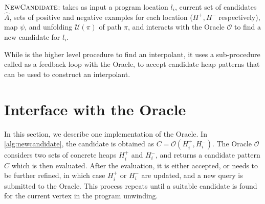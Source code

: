 \begin{algorithm}[ht]


  \caption{$\textsc{NewCandidate}$: takes as input a program location $l_i$, current set of candidates $\hat{A}$, sets of positive and negative examples for each location ($H^{+}, H^{-}$ respectively), map $\psi$, and unfolding $\mathcal{U}(\pi)$ of path $\pi$, and interacts with the Oracle $\mathcal{O}$ to find a new candidate for $l_i$.}
  \label{alg:newcandidate}
\end{algorithm}

While \seplearner is the higher level procedure to find an interpolant, it uses a sub-procedure called \newcandidate as a feedback loop with the Oracle, to accept candidate heap patterns that can be used to construct an interpolant.

\section{Interface with the Oracle}
\label{sec:interface-oracle}

In this section, we describe one implementation of the Oracle. In \autoref{alg:newcandidate}, the candidate is obtained as $C = \mathcal{O}(H_i^{+}, H_i^{-})$. The Oracle $\mathcal{O}$ considers two sets of concrete heaps $H_i^{+}$ and $H_i^{-}$, and returns a candidate pattern $C$ which is then evaluated. After the evaluation, it is either accepted, or needs to be further refined, in which case $H_i^{+}$ or $H_i^{-}$ are updated, and a new query is submitted to the Oracle. This process repeats until a suitable candidate is found for the current vertex in the program unwinding.

